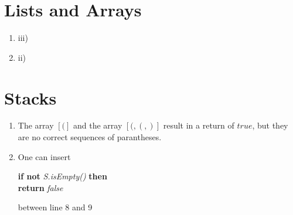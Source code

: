 \documentclass[sectionformat = exercise]{gadsescript}
\begin{document}
\maketitle
\section{Lists and Arrays}
\begin{enumerate}[label=\alph*)]
	\item iii)
	\item ii)
\end{enumerate}

\section{Stacks}
\begin{enumerate}[label=\alph*)]
	\item The array $[(]$ and the array $[(, (, )]$ result in a return of $true$, but they are no correct sequences of parantheses.
	\item One can insert
		\begin{algorithm*}
			\textbf{if not} \textit{S.isEmpty()} \textbf{then}\\
			\quad \textbf{return} \textit{false}
		\end{algorithm*}
		between line 8 and 9
\end{enumerate}
\end{document}
